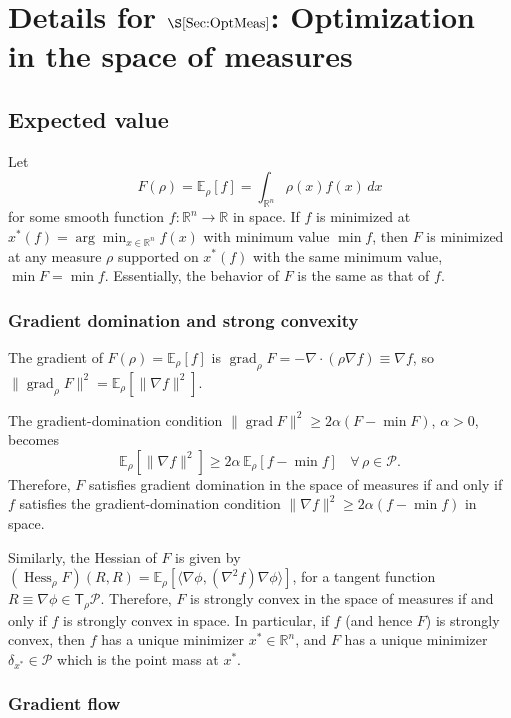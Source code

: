 \documentclass[final,12pt]{colt2018}
\newcommand{\R}{\mathbb{R}}
\newcommand{\E}{\mathbb{E}}
\DeclareMathOperator{\grad}{grad}
\DeclareMathOperator{\Hess}{Hess}
\newcommand{\T}{\mathsf{T}}
\renewcommand{\P}{\mathcal{P}}
\begin{document}
\section{Details for $\S\ref{Sec:OptMeas}$: Optimization in the space of measures} 

\subsection{Expected value}
\label{App:ExpVal}

Let
$$F(\rho) = \E_\rho[f] = \int_{\R^n} \rho(x) f(x) \, dx$$
for some smooth function $f \colon \R^n \to \R$ in space.
If $f$ is minimized at $x^\ast(f) = \arg\min_{x \in \R^n} f(x)$ with minimum value $\min f$,
then $F$ is minimized at any measure $\rho$ supported on $x^\ast(f)$ with the same minimum value, $\min F = \min f$.
Essentially, the behavior of $F$ is the same as that of $f$.

\subsubsection{Gradient domination and strong convexity}

The gradient of $F(\rho) = \E_\rho[f]$ is $\grad_\rho F = -\nabla \cdot (\rho \nabla f) \equiv \nabla f$, so 
$\|\grad_\rho F\|^2 = \E_\rho[\|\nabla f\|^2]$.

The gradient-domination condition $\|\grad F\|^2 \ge 2\alpha (F-\min F)$, $\alpha > 0$, becomes
$$\E_\rho[\|\nabla f\|^2] \ge 2\alpha \, \E_\rho[f-\min f]~~~~\forall \, \rho \in \P.$$
Therefore, $F$ satisfies gradient domination in the space of measures if and only if $f$ satisfies the gradient-domination condition $\|\nabla f\|^2 \ge 2\alpha(f - \min f)$ in space.

Similarly, the Hessian of $F$ is given by $(\Hess_\rho F)(R,R) = \E_\rho[\langle \nabla \phi, (\nabla^2 f) \nabla \phi \rangle]$, for a tangent function $R \equiv \nabla \phi \in \T_\rho \P$.
Therefore,
$F$ is strongly convex in the space of measures if and only if $f$ is strongly convex in space.
In particular, if $f$ (and hence $F$) is strongly convex, then $f$ has a unique minimizer $x^\ast \in \R^n$, and $F$ has a unique minimizer $\delta_{x^\ast} \in \P$ which is the point mass at $x^\ast$.


\subsubsection{Gradient flow}
\label{Sec:GFF}
\end{document}

